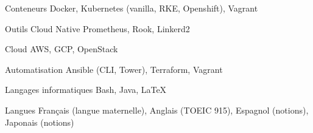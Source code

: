 

\begin{cvskills}

  \cvskill
    {Conteneurs} %
    {Docker, Kubernetes (vanilla, RKE, Openshift), Vagrant} %

  \cvskill
    {Outils Cloud Native} %
    {Prometheus, Rook, Linkerd2} %

  \cvskill
    {Cloud} %
    {AWS, GCP, OpenStack} %

  \cvskill
    {Automatisation} %
    {Ansible (CLI, Tower), Terraform, Vagrant} %

  \cvskill
    {Langages informatiques} %
    {Bash, Java, LaTeX} %

  \cvskill
    {Langues} %
    {Français (langue maternelle), Anglais (TOEIC 915), Espagnol (notions), Japonais (notions)} %

\end{cvskills}
